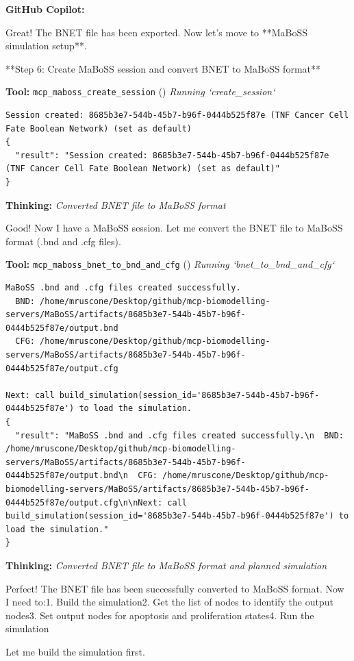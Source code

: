 \documentclass[11pt,a4paper]{article}
\begin{document}
\begin{copilotbox}
\textbf{GitHub Copilot:}

Great! The BNET file has been exported. Now let's move to **MaBoSS simulation setup**.

**Step 6: Create MaBoSS session and convert BNET to MaBoSS format**

\end{copilotbox}
\begin{toolokbox}
\textbf{Tool:} \texttt{mcp\_maboss\_create\_session} (\checkmark)
\textit{Running `create\_session`}
\begin{lstlisting}
Session created: 8685b3e7-544b-45b7-b96f-0444b525f87e (TNF Cancer Cell Fate Boolean Network) (set as default)
{
  "result": "Session created: 8685b3e7-544b-45b7-b96f-0444b525f87e (TNF Cancer Cell Fate Boolean Network) (set as default)"
}
\end{lstlisting}
\end{toolokbox}
\begin{thinkbox}
\textbf{Thinking:} \textit{Converted BNET file to MaBoSS format}

Good! Now I have a MaBoSS session. Let me convert the BNET file to MaBoSS format (.bnd and .cfg files).

\end{thinkbox}
\begin{toolokbox}
\textbf{Tool:} \texttt{mcp\_maboss\_bnet\_to\_bnd\_and\_cfg} (\checkmark)
\textit{Running `bnet\_to\_bnd\_and\_cfg`}
\begin{lstlisting}
MaBoSS .bnd and .cfg files created successfully.
  BND: /home/mruscone/Desktop/github/mcp-biomodelling-servers/MaBoSS/artifacts/8685b3e7-544b-45b7-b96f-0444b525f87e/output.bnd
  CFG: /home/mruscone/Desktop/github/mcp-biomodelling-servers/MaBoSS/artifacts/8685b3e7-544b-45b7-b96f-0444b525f87e/output.cfg

Next: call build_simulation(session_id='8685b3e7-544b-45b7-b96f-0444b525f87e') to load the simulation.
{
  "result": "MaBoSS .bnd and .cfg files created successfully.\n  BND: /home/mruscone/Desktop/github/mcp-biomodelling-servers/MaBoSS/artifacts/8685b3e7-544b-45b7-b96f-0444b525f87e/output.bnd\n  CFG: /home/mruscone/Desktop/github/mcp-biomodelling-servers/MaBoSS/artifacts/8685b3e7-544b-45b7-b96f-0444b525f87e/output.cfg\n\nNext: call build_simulation(session_id='8685b3e7-544b-45b7-b96f-0444b525f87e') to load the simulation."
}
\end{lstlisting}
\end{toolokbox}
\begin{thinkbox}
\textbf{Thinking:} \textit{Converted BNET file to MaBoSS format and planned simulation}

Perfect! The BNET file has been successfully converted to MaBoSS format. Now I need to:1. Build the simulation2. Get the list of nodes to identify the output nodes3. Set output nodes for apoptosis and proliferation states4. Run the simulation

Let me build the simulation first.

\end{thinkbox}
\end{document}
